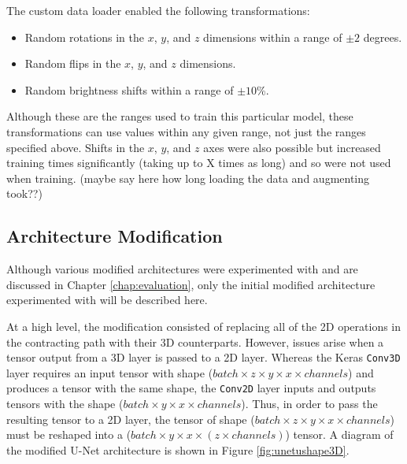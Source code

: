The custom data loader enabled the following transformations:
\begin{itemize}
    \item Random rotations in the $x$, $y$, and $z$ dimensions within a range of $\pm 2$ degrees.
    \item Random flips in the $x$, $y$, and $z$ dimensions.
    \item Random brightness shifts within a range of $\pm 10$\%.
\end{itemize}
Although these are the ranges used to train this particular model, these transformations can use values within any given range, not just the ranges specified above. Shifts in the $x$, $y$, and $z$ axes were also possible but increased training times significantly (taking up to X times as long) and so were not used when training. (maybe say here how long loading the data and augmenting took??)

\subsection{Architecture Modification}

Although various modified architectures were experimented with and are discussed in Chapter \ref{chap:evaluation}, only the initial modified architecture experimented with will be described here.

At a high level, the modification consisted of replacing all of the 2D operations in the contracting path with their 3D counterparts. However, issues arise when a tensor output from a 3D layer is passed to a 2D layer. Whereas the Keras \texttt{Conv3D} layer requires an input tensor with shape ($batch \times z \times y \times x \times channels$) and produces a tensor with the same shape, the \texttt{Conv2D} layer inputs and outputs tensors with the shape ($batch \times y \times x \times channels$). Thus, in order to pass the resulting tensor to a 2D layer, the tensor of shape ($batch \times z \times y \times x \times channels$) must be reshaped into a ($batch \times y \times x \times (z \times channels)$) tensor. A diagram of the modified U-Net architecture is shown in Figure \ref{fig:unetushape3D}.

